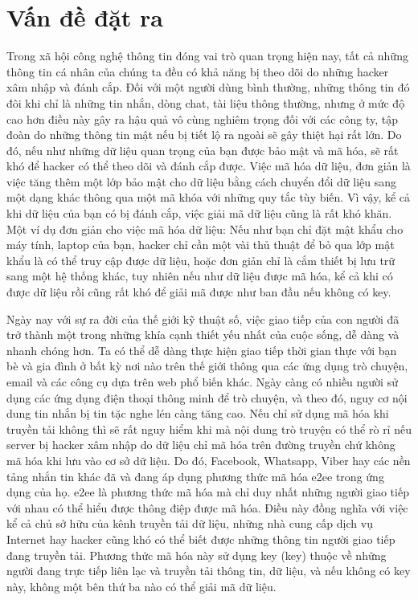 \documentclass[../main-report.tex]{subfiles}
\begin{document}
\section{Vấn đề đặt ra}
\label{sec:problem}
Trong xã hội công nghệ thông tin đóng vai trò quan trọng hiện nay, tất cả những thông tin cá nhân của chúng ta đều có khả năng bị theo dõi do những hacker xâm nhập và đánh cắp. Đối với một người dùng bình thường, những thông tin đó đôi khi chỉ là những tin nhắn, dòng chat, tài liệu thông thường, nhưng ở mức độ cao hơn điều này gây ra hậu quả vô cùng nghiêm trọng đối với các công ty, tập đoàn do những thông tin mật nếu bị tiết lộ ra ngoài sẽ gây thiệt hại rất lớn. Do đó, nếu như những dữ liệu quan trọng của bạn được bảo mật và mã hóa, sẽ rất khó để hacker có thể theo dõi và đánh cắp được. Việc mã hóa dữ liệu, đơn giản là việc tăng thêm một lớp bảo mật cho dữ liệu bằng cách chuyển đổi dữ liệu sang một dạng khác thông qua một mã khóa với những quy tắc tùy biến. Vì vậy, kể cả khi dữ liệu của bạn có bị đánh cắp, việc giải mã dữ liệu cũng là rất khó khăn. Một ví dụ đơn giản cho việc mã hóa dữ liệu: Nếu như bạn chỉ đặt mật khẩu cho máy tính, laptop của bạn, hacker chỉ cần một vài thủ thuật để bỏ qua lớp mật khẩu là có thể truy cập được dữ liệu, hoặc đơn giản chỉ là cắm thiết bị lưu trữ sang một hệ thống khác, tuy nhiên nếu như dữ liệu được mã hóa, kể cả khi có được dữ liệu rồi cũng rất khó để giải mã được như ban đầu nếu không có \glsdesc{key}.

Ngày nay với sự ra đời của thế giới kỹ thuật số, việc giao tiếp của con người đã trở thành một trong những khía cạnh thiết yếu nhất của cuộc sống, dễ dàng và nhanh chóng hơn. Ta có thể dễ dàng thực hiện giao tiếp thời gian thực với bạn bè và gia đình ở bất kỳ nơi nào trên thế giới thông qua các ứng dụng trò chuyện, email và các công cụ dựa trên web phổ biến khác. Ngày càng có nhiều người sử dụng các ứng dụng điện thoại thông minh để trò chuyện, và theo đó, nguy cơ nội dung tin nhắn bị tin tặc nghe lén càng tăng cao. Nếu chỉ sử dụng mã hóa khi truyền tải không thì sẽ rất nguy hiểm khi mà nội dung trò truyện có thể rò rỉ nếu server bị hacker xâm nhập do dữ liệu chỉ mã hóa trên đường truyền chứ không mã hóa khi lưu vào cơ sở dữ liệu. Do đó, Facebook, Whatsapp, Viber hay các nền tảng nhắn tin khác đã và đang áp dụng phương thức mã hóa \acrfull{e2ee} trong ứng dụng của họ. \acrshort{e2ee} là phương thức mã hóa mà chỉ duy nhất những người giao tiếp với nhau có thể hiểu được thông điệp được mã hóa. Điều này đồng nghĩa với việc kể cả chủ sở hữu của kênh truyền tải dữ liệu, những nhà cung cấp dịch vụ Internet hay hacker cũng khó có thể biết được những thông tin người giao tiếp đang truyền tải. Phương thức mã hóa này sử dụng \glsdesc{key} (\gls{key}) thuộc về những người đang trực tiếp liên lạc và truyền tải thông tin, dữ liệu, và nếu không có \glsdesc{key} này, không một bên thứ ba nào có thể giải mã dữ liệu.
\end{document}
